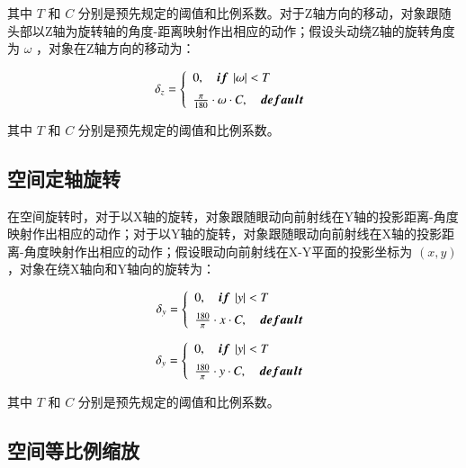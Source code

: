 其中 $T$ 和 $C$ 分别是预先规定的阈值和比例系数。对于Z轴方向的移动，对象跟随头部以Z轴为旋转轴的角度-距离映射作出相应的动作；假设头动绕Z轴的旋转角度为 $\omega$ ，对象在Z轴方向的移动为：

\begin{equation}
	\label{formula-3-4}
	\delta_z = 
    \left\{
    \begin{array}{l}
        0, \quad {\mbox{\boldmath $if$}}\ \left|\omega\right| < T \\ [0.2cm]
        \frac{\pi}{180} \cdot \omega \cdot C,\quad {\mbox{\boldmath $default$}}
    \end{array}
    \right.
\end{equation}

其中 $T$ 和 $C$ 分别是预先规定的阈值和比例系数。

\subsection{空间定轴旋转}

在空间旋转时，对于以X轴的旋转，对象跟随眼动向前射线在Y轴的投影距离-角度映射作出相应的动作；对于以Y轴的旋转，对象跟随眼动向前射线在X轴的投影距离-角度映射作出相应的动作；假设眼动向前射线在X-Y平面的投影坐标为 $(x, y)$ ，对象在绕X轴向和Y轴向的旋转为：

\begin{equation}
	\label{formula-3-5}
	\delta_y = 
    \left\{
    \begin{array}{l}
        0, \quad {\mbox{\boldmath $if$}}\ \left|y\right| < T \\ [0.2cm]
        \frac{180}{\pi} \cdot x \cdot C,\quad {\mbox{\boldmath $default$}}
    \end{array}
    \right.
\end{equation}
 
\begin{equation}
	\label{formula-3-6}
	\delta_y = 
    \left\{
    \begin{array}{l}
        0, \quad {\mbox{\boldmath $if$}}\ \left|y\right| < T \\ [0.2cm]
        \frac{180}{\pi} \cdot y \cdot C,\quad {\mbox{\boldmath $default$}}
    \end{array}
    \right.
\end{equation}

其中 $T$ 和 $C$ 分别是预先规定的阈值和比例系数。

\subsection{空间等比例缩放}

